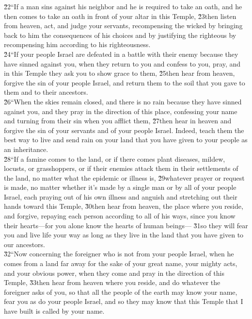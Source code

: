 \begin{poetry}
\poeml \v{22}``If a man sins against his neighbor and he is required to take an oath, and he then comes to take an oath in front of your altar in this Temple, \v{23}then listen from heaven, act, and judge your servants, recompensing the wicked by bringing back to him the consequences of his choices and by justifying the righteous by recompensing him according to his righteousness. \\
\poeml \v{24}``If your people Israel are defeated in a battle with their enemy because they have sinned against you, when they return to you and confess to you, pray, and in this Temple they ask you to show grace to them, \v{25}then hear from heaven, forgive the sin of your people Israel, and return them to the soil that you gave to them and to their ancestors. \\
\poeml \v{26}``When the skies remain closed, and there is no rain because they have sinned against you, and they pray in the direction of this place, confessing your name and turning from their sin when you afflict them, \v{27}then hear in heaven and forgive the sin of your servants and of your people Israel. Indeed, teach them the best way to live and send rain on your land that you have given to your people as an inheritance. \\
\poeml \v{28}``If a famine comes to the land, or if there comes plant diseases, mildew, locusts, or grasshoppers, or if their enemies attack them in their settlements of the land, no matter what the epidemic or illness is, \v{29}whatever prayer or request is made, no matter whether it's made by a single man or by all of your people Israel, each praying out of his own illness and anguish and stretching out their hands toward this Temple, \v{30}then hear from heaven, the place where you reside, and forgive, repaying each person according to all of his ways, since you know their hearts---for you alone know the hearts of human beings--- \v{31}so they will fear you and live life your way as long as they live in the land that you have given to our ancestors. \\
\poeml \v{32}``Now concerning the foreigner who is not from your people Israel, when he comes from a land far away for the sake of your great name, your mighty acts, and your obvious power, when they come and pray in the direction of this Temple, \v{33}then hear from heaven where you reside, and do whatever the foreigner asks of you, so that all the people of the earth may know your name, fear you as do your people Israel, and so they may know that this Temple that I have built is called by your name. \\

\end{poetry}
